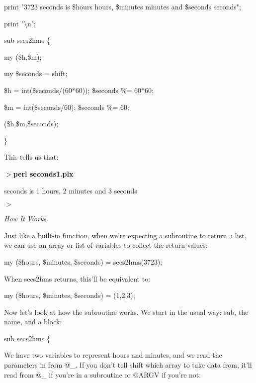 \documentclass[a4paper,11pt]{book}
\begin{document}
\noindent print "3723 seconds is \$hours hours, \$minutes minutes and \$seconds seconds";

\noindent print "\textbackslash n";

\noindent 

\noindent sub secs2hms \{

\noindent my (\$h,\$m);

\noindent my \$seconds = shift;

\noindent \$h = int(\$seconds/(60*60)); \$seconds \%= 60*60;

\noindent \$m = int(\$seconds/60); \$seconds \%= 60;

\noindent (\$h,\$m,\$seconds);

\noindent \}

\noindent 

\noindent This tells us that:

\noindent 

\noindent $>$\textbf{perl seconds1.plx}

 seconds is 1 hours, 2 minutes and 3 seconds

\noindent $>$

\noindent 

\noindent \textit{How It Works}

\noindent Just like a built-in function, when we're expecting a subroutine to return a list, we can use an array or list of variables to collect the return values:

\noindent 

\noindent 

\noindent my (\$hours, \$minutes, \$seconds) = secs2hms(3723);

\noindent 

\noindent When secs2hms returns, this'll be equivalent to:

\noindent 

\noindent 

\noindent my (\$hours, \$minutes, \$seconds) = (1,2,3);

\noindent 

\noindent Now let's look at how the subroutine works. We start in the usual way: sub, the name, and a block:

\noindent 

\noindent 

\noindent sub secs2hms \{

\noindent 

\noindent We have two variables to represent hours and minutes, and we read the parameters in from @\_. If you don't tell shift which array to take data from, it'll read from @\_ if you're in a subroutine or @ARGV if you're not:
\end{document}
